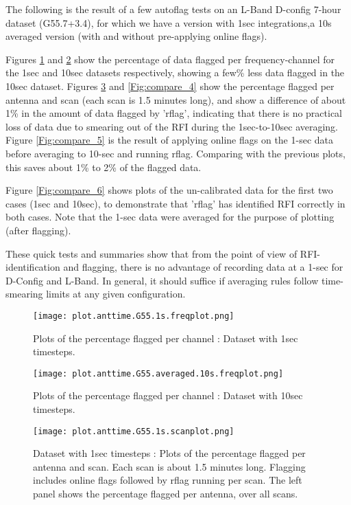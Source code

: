 The following is the result of a few autoflag tests on an L-Band D-config 7-hour dataset (G55.7+3.4), for which we have a version with 1sec integrations,a 10s averaged version (with and without pre-applying online flags).


Figures \ref{Fig:compare_1} and \ref{Fig:compare_2} show the percentage of data flagged per frequency-channel for the 1sec and 10sec datasets respectively, showing a few\% less data flagged in the 10sec dataset.  Figures \ref{Fig:compare_3} and \ref{Fig:compare_4} show the percentage flagged per antenna and scan (each scan is 1.5 minutes long), and show a difference of about 1\% in the amount of data flagged by 'rflag', indicating that there is no practical loss of data due to smearing out of the RFI during the 1sec-to-10sec averaging. 
Figure  \ref{Fig:compare_5} is the result of applying online flags on the 1-sec data before averaging to 10-sec and running rflag. Comparing with the previous plots, this saves about 1\% to 2\% of the flagged data. 

Figure  \ref{Fig:compare_6} shows plots of the un-calibrated data for the first two cases (1sec and 10sec), to demonstrate that 'rflag' has identified RFI correctly in both cases. Note that the 1-sec data were averaged for the purpose of plotting (after flagging).

These quick tests and summaries show that from the point of view of RFI-identification and flagging, there is no advantage of recording data at a 1-sec for D-Config and L-Band. In general, it should suffice if averaging rules follow time-smearing limits at any given configuration.

\begin{figure}
\texttt{[image: plot.anttime.G55.1s.freqplot.png]}
\caption{Plots of the percentage flagged per channel :  Dataset with 1sec timesteps.}
\label{Fig:compare_1}
\end{figure}

\begin{figure}
\texttt{[image: plot.anttime.G55.averaged.10s.freqplot.png]}
\caption{Plots of the percentage flagged per channel : Dataset with 10sec timesteps.}
\label{Fig:compare_2}
\end{figure}

\begin{figure}
\texttt{[image: plot.anttime.G55.1s.scanplot.png]}
\caption{Dataset with 1sec timesteps : Plots of the percentage flagged per antenna and scan. Each scan is about 1.5 minutes long. Flagging includes online flags followed by rflag running per scan. The left panel shows the percentage flagged per antenna, over all scans.}
\label{Fig:compare_3}
\end{figure}

